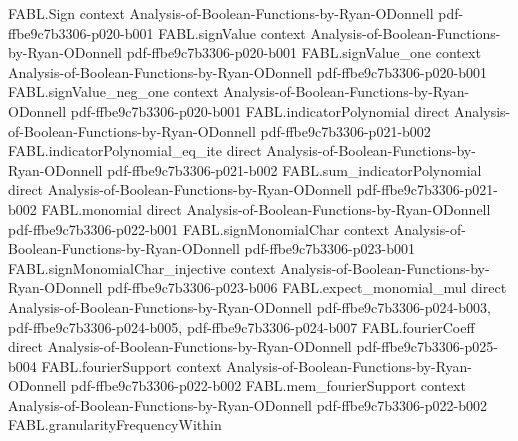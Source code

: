 \begin{theorem}
\label{FABL.condorcetWinnerProbability_eq_noiseStability}
\leanok
{}
\proofstep
  {FABL.Sign}
  {context}
  {Analysis-of-Boolean-Functions-by-Ryan-ODonnell}
  {pdf-ffbe9c7b3306-p020-b001}
\proofstep
  {FABL.signValue}
  {context}
  {Analysis-of-Boolean-Functions-by-Ryan-ODonnell}
  {pdf-ffbe9c7b3306-p020-b001}
\proofstep
  {FABL.signValue_one}
  {context}
  {Analysis-of-Boolean-Functions-by-Ryan-ODonnell}
  {pdf-ffbe9c7b3306-p020-b001}
\proofstep
  {FABL.signValue_neg_one}
  {context}
  {Analysis-of-Boolean-Functions-by-Ryan-ODonnell}
  {pdf-ffbe9c7b3306-p020-b001}
\proofstep
  {FABL.indicatorPolynomial}
  {direct}
  {Analysis-of-Boolean-Functions-by-Ryan-ODonnell}
  {pdf-ffbe9c7b3306-p021-b002}
\proofstep
  {FABL.indicatorPolynomial_eq_ite}
  {direct}
  {Analysis-of-Boolean-Functions-by-Ryan-ODonnell}
  {pdf-ffbe9c7b3306-p021-b002}
\proofstep
  {FABL.sum_indicatorPolynomial}
  {direct}
  {Analysis-of-Boolean-Functions-by-Ryan-ODonnell}
  {pdf-ffbe9c7b3306-p021-b002}
\proofstep
  {FABL.monomial}
  {direct}
  {Analysis-of-Boolean-Functions-by-Ryan-ODonnell}
  {pdf-ffbe9c7b3306-p022-b001}
\proofstep
  {FABL.signMonomialChar}
  {context}
  {Analysis-of-Boolean-Functions-by-Ryan-ODonnell}
  {pdf-ffbe9c7b3306-p023-b001}
\proofstep
  {FABL.signMonomialChar_injective}
  {context}
  {Analysis-of-Boolean-Functions-by-Ryan-ODonnell}
  {pdf-ffbe9c7b3306-p023-b006}
\proofstep
  {FABL.expect_monomial_mul}
  {direct}
  {Analysis-of-Boolean-Functions-by-Ryan-ODonnell}
  {pdf-ffbe9c7b3306-p024-b003,
    pdf-ffbe9c7b3306-p024-b005,
    pdf-ffbe9c7b3306-p024-b007}
\proofstep
  {FABL.fourierCoeff}
  {direct}
  {Analysis-of-Boolean-Functions-by-Ryan-ODonnell}
  {pdf-ffbe9c7b3306-p025-b004}
\proofstep
  {FABL.fourierSupport}
  {context}
  {Analysis-of-Boolean-Functions-by-Ryan-ODonnell}
  {pdf-ffbe9c7b3306-p022-b002}
\proofstep
  {FABL.mem_fourierSupport}
  {context}
  {Analysis-of-Boolean-Functions-by-Ryan-ODonnell}
  {pdf-ffbe9c7b3306-p022-b002}
\proofstep
  {FABL.granularityFrequencyWithin}

\end{theorem}
